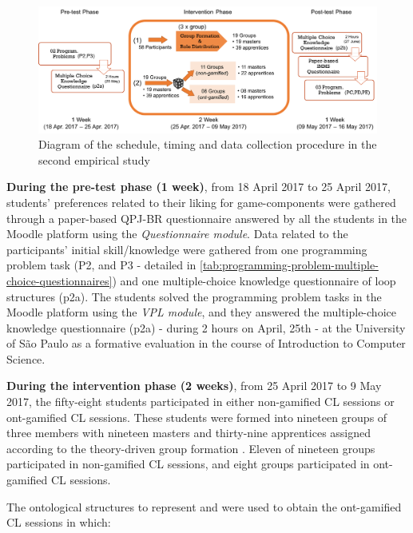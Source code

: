 \begin{figure}[htb]
 \caption{Diagram of the schedule, timing and data collection procedure in the second empirical study}
 \label{fig:data-collection-procedure-second-study}
 \centering
 \includegraphics[width=1\textwidth]{images/chap-evaluation/data-collection-procedure-second-study.png}
 \fautor
\end{figure}

\textbf{During the pre-test phase (1 week)}, from 18 April 2017 to 25 April 2017, students' preferences related to their liking for game-components were gathered through a paper-based QPJ-BR questionnaire answered by all the students in the Moodle platform using the \emph{Questionnaire module}.
Data related to the participants' initial skill/knowledge were gathered from one programming problem task (P2, and P3 - detailed in \autoref{tab:programming-problem-multiple-choice-questionnaires}) and one multiple-choice knowledge questionnaire of loop structures (p2a).
The students solved the programming problem tasks in the Moodle platform using the \emph{VPL module}, and they answered the multiple-choice knowledge questionnaire (p2a) - during 2 hours on April, 25th - at the University of São Paulo as a formative evaluation in the course of Introduction to Computer Science. 

\textbf{During the intervention phase (2 weeks)}, from 25 April 2017 to 9 May 2017, the fifty-eight students participated in either non-gamified CL sessions or ont-gamified CL sessions.
These students were formed into nineteen groups of three members with nineteen masters and thirty-nine apprentices assigned according to the theory-driven group formation \cite{IsotaniMizoguchi2008a}.
Eleven of nineteen groups participated in non-gamified CL sessions, and eight groups participated in ont-gamified CL sessions.

The ontological structures to represent  and  were used to obtain the ont-gamified CL sessions in which:

